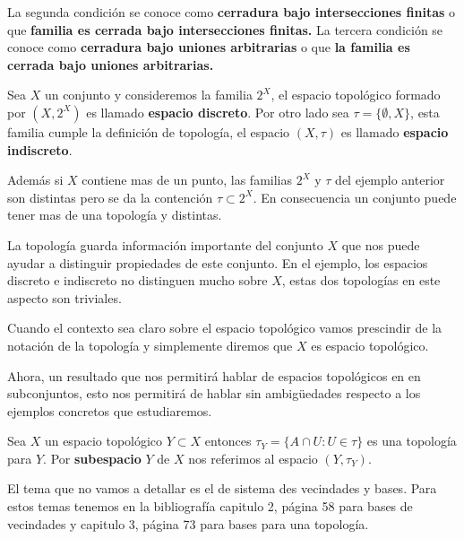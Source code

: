 \begin{nt}
La segunda condición se conoce como \textbf{cerradura bajo intersecciones finitas} o que \textbf{familia es cerrada bajo intersecciones finitas.} La tercera condición se conoce como \textbf{cerradura bajo uniones arbitrarias} o que \textbf{la familia es cerrada bajo uniones arbitrarias.}
\end{nt}

\begin{ej}
Sea $X$ un conjunto y consideremos la familia $2^X$, el espacio topológico formado por $(X, 2^X)$ es llamado \textbf{espacio discreto}. Por otro lado sea $\tau=\{\emptyset, X\}$, esta familia cumple la definición de topología, el espacio $(X, \tau)$ es llamado \textbf{espacio indiscreto}.
\end{ej}

Además si $X$ contiene mas de un punto, las familias $2^X$ y $\tau$ del ejemplo anterior son distintas pero se da la contención  $\tau \subset 2^X$. En consecuencia un conjunto puede tener mas de una topología y distintas. 

La topología guarda información importante del conjunto $X$ que nos puede ayudar a distinguir propiedades de este conjunto. En el ejemplo, los espacios discreto e indiscreto no distinguen mucho sobre $X$, estas dos topologías en este aspecto son triviales.

\begin{cn}
Cuando el contexto sea claro sobre el espacio topológico vamos prescindir de la notación de la topología y simplemente diremos que $X$ es espacio topológico. 
\end{cn}

Ahora, un resultado que nos permitirá hablar de espacios topológicos en en subconjuntos, esto nos permitirá de hablar sin ambigüedades respecto a los ejemplos concretos que estudiaremos. 

\begin{te}
Sea $X$ un espacio topológico $Y \subset X$ entonces $\tau_Y =\{A \cap U: U \in \tau\}$ es una topología para $Y$. Por \textbf{subespacio} $Y$ de $X$ nos referimos al espacio $(Y, \tau_Y)$.
\end{te}

\begin{cn}
El tema que no vamos a detallar es el de sistema des vecindades y bases. Para estos temas tenemos en la bibliografía \cite{top_prieto} capitulo 2, página 58 para bases de vecindades y capitulo 3, página 73 para bases para una topología.
\end{cn}

